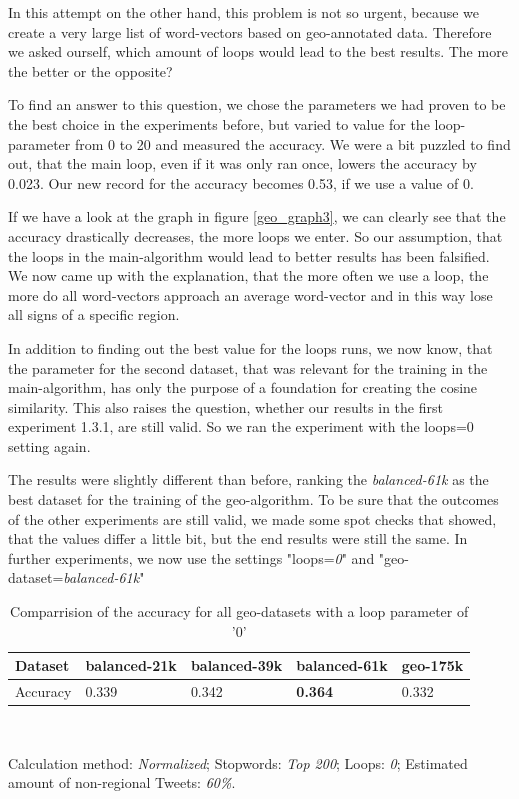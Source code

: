 \documentclass[../Main.tex]{subfiles}
\begin{document}
In this attempt on the other hand, this problem is not so urgent, because we create a very large list of word-vectors based on geo-annotated data. Therefore we asked ourself, which amount of loops would lead to the best results. The more the better or the opposite? 

To find an answer to this question, we chose the parameters we had proven to be the best choice in the experiments before, but varied to value for the loop-parameter from 0 to 20 and measured the accuracy. 
We were a bit puzzled to find out, that the main loop, even if it was only ran once, lowers the accuracy by 0.023. Our new record for the accuracy becomes 0.53, if we use a value of 0. 

If we have a look at the graph in figure \ref{geo_graph3}, we can clearly see that the accuracy drastically decreases, the more loops we enter. So our assumption, that the loops in the main-algorithm would lead to better results has been falsified. We now came up with the explanation, that the more often we use a loop, the more do all word-vectors approach an average word-vector and in this way lose all signs of a specific region.

In addition to finding out the best value for the loops runs, we now know, that the parameter for the second dataset, that was relevant for the training in the main-algorithm, has only the purpose of a foundation for creating the cosine similarity. This also raises the question, whether our results in the first experiment 1.3.1, are still valid. So we ran the experiment with the loops=0 setting again.

The results were slightly different than before, ranking the \emph{balanced-61k} as the best dataset for the training of the geo-algorithm. To be sure that the outcomes of the other experiments are still valid, we made some spot checks that showed, that the values differ a little bit, but the end results were still the same. In further experiments, we now use the settings "loops=\emph{0}" and "geo-dataset=\emph{balanced-61k}"
\begin{table}
\begin{center}
    \begin{tabular}{|l|llll|}
    \hline
    Dataset     & balanced-21k & balanced-39k & balanced-61k & geo-175k \\ \hline
    Accuracy    & 0.339       & 0.342        & \textbf{0.364 }       & 0.332                \\ \hline
    \end{tabular} \\
\end{center}
  Calculation method: \textit{Normalized}; Stopwords: \textit{Top 200}; Loops: \textit{0}; Estimated amount of non-regional Tweets: \textit{60\%}.
  \caption{Comparrision of the accuracy for all geo-datasets with a loop parameter of '0'}
  \label{geo_datasets}
\end{table}
\end{document}
